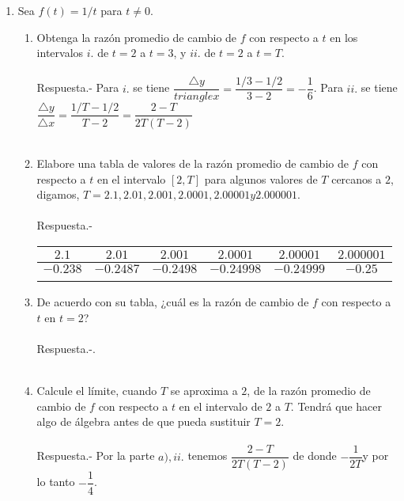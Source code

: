 \begin{enumerate}
\begin{enumerate}[\bfseries a)]
\end{enumerate}

\item Sea $f(t)=1/t$ para $t\neq 0$.
\begin{enumerate}[\bfseries a)]
    
    \item Obtenga la razón promedio de cambio de $f$ con respecto a $t$ en los intervalos $i.$ de $t = 2$ a $t = 3$, y $ii.$ de $t = 2$ a $t = T$.\\\\
	Respuesta.-\; Para $i.$ se tiene $\dfrac{\triangle y}{triangle x} = \dfrac{1/3 - 1/2}{3-2} = -\dfrac{1}{6}$. Para $ii.$ se tiene $\dfrac{\triangle y}{\triangle x} = \dfrac{1/T - 1/2}{T-2} = \dfrac{2-T}{2T(T-2)}$\\\\

    \item Elabore una tabla de valores de la razón promedio de cambio de $f$ con respecto a $t$ en el intervalo $[2, T]$ para algunos valores de $T$ cercanos a $2$, digamos, $T = 2.1, 2.01, 2.001, 2.0001, 2.00001 y 2.000001.$\\\\
	Respuesta.-\; 
	\begin{center}
	    \begin{tabular}{c|c|c|c|c|c}
		$2.1$&$2.01$&$2.001$&$2.0001$&$2.00001$&$2.000001$\\
		\hline
		$-0.238$&$-0.2487$&$-0.2498$&$-0.24998$&$-0.24999$&$-0.25$\\\\
	    \end{tabular}
	\end{center}

    \item De acuerdo con su tabla, ¿cuál es la razón de cambio de $f$ con respecto a $t$ en $t = 2$?\\\\
	Respuesta.-.\\\\

    \item Calcule el límite, cuando $T$ se aproxima a $2$, de la razón promedio de cambio de $f$ con respecto a $t$ en el intervalo de $2$ a $T$. Tendrá que hacer algo de álgebra antes de que pueda sustituir $T = 2.$\\\\
	Respuesta.-\; Por la parte $a), ii.$ tenemos $\dfrac{2-T}{2T(T-2)}$ de donde $-\dfrac{1}{2T}$y por lo tanto $-\dfrac{1}{4}$.\\\\


\end{enumerate}
\end{enumerate}
